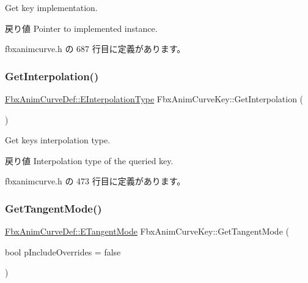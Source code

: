 Get key implementation. \begin{DoxyReturn}{戻り値}
Pointer to implemented instance. 
\end{DoxyReturn}


 fbxanimcurve.\+h の 687 行目に定義があります。

\mbox{\label{class_fbx_anim_curve_key_afe707d042861d5f6d5e22f4811a725ac}} 
\subsubsection{\texorpdfstring{Get\+Interpolation()}{GetInterpolation()}}
{\footnotesize\ttfamily \hyperlink{class_fbx_anim_curve_def_add2ab7d10d856ab0868cc9b143d59ea5}{Fbx\+Anim\+Curve\+Def\+::\+E\+Interpolation\+Type} Fbx\+Anim\+Curve\+Key\+::\+Get\+Interpolation (\begin{DoxyParamCaption}{ }\end{DoxyParamCaption})\hspace{0.3cm}{\ttfamily [inline]}}

Get key\textquotesingle{}s interpolation type. \begin{DoxyReturn}{戻り値}
Interpolation type of the queried key. 
\end{DoxyReturn}


 fbxanimcurve.\+h の 473 行目に定義があります。

\mbox{\label{class_fbx_anim_curve_key_a3821c01c7e1b422efcf2fedd074ffb6a}} 
\subsubsection{\texorpdfstring{Get\+Tangent\+Mode()}{GetTangentMode()}}
{\footnotesize\ttfamily \hyperlink{class_fbx_anim_curve_def_ac810ccc5ca0527704ab5175479964b87}{Fbx\+Anim\+Curve\+Def\+::\+E\+Tangent\+Mode} Fbx\+Anim\+Curve\+Key\+::\+Get\+Tangent\+Mode (\begin{DoxyParamCaption}\item[{bool}]{p\+Include\+Overrides = {\ttfamily false} }\end{DoxyParamCaption})\hspace{0.3cm}{\ttfamily [inline]}}

